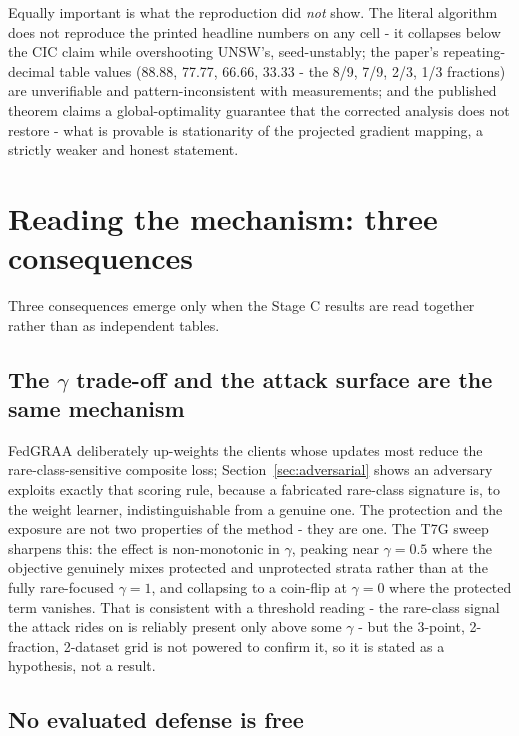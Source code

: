 \documentclass[11pt,a4paper]{report}
\begin{document}
Equally important is what the reproduction did \emph{not} show. The literal
algorithm does not reproduce the printed headline numbers on any cell - it
collapses below the CIC claim while overshooting UNSW's, seed-unstably; the
paper's repeating-decimal table values (88.88, 77.77, 66.66,
33.33 - the 8/9, 7/9, 2/3, 1/3 fractions) are unverifiable and
pattern-inconsistent with measurements; and the
published theorem claims a global-optimality guarantee that the corrected
analysis does not restore - what is provable is stationarity of the
projected gradient mapping, a strictly weaker and honest statement.

\section{Reading the mechanism: three consequences}
\label{sec:reading-mechanism}

Three consequences emerge only when the Stage C results are read together
rather than as independent tables.

\subsection{The \texorpdfstring{$\gamma$}{gamma} trade-off and the attack surface are the same
mechanism}

FedGRAA deliberately up-weights the clients whose updates most
reduce the rare-class-sensitive composite loss; Section~\ref{sec:adversarial}
shows an adversary exploits exactly that scoring rule, because a fabricated
rare-class signature is, to the weight learner, indistinguishable from a
genuine one. The protection and the exposure are not two properties of the
method - they are one. The T7G sweep sharpens this: the effect is
non-monotonic in $\gamma$, peaking near $\gamma = 0.5$ where the objective
genuinely mixes protected and unprotected strata rather than at the fully
rare-focused $\gamma = 1$, and collapsing to a coin-flip at $\gamma = 0$
where the protected term vanishes. That is consistent with a threshold
reading - the rare-class signal the attack rides on is reliably present only
above some $\gamma$ - but the 3-point, 2-fraction, 2-dataset grid is not
powered to confirm it, so it is stated as a hypothesis, not a result.

\subsection{No evaluated defense is free}
\end{document}
